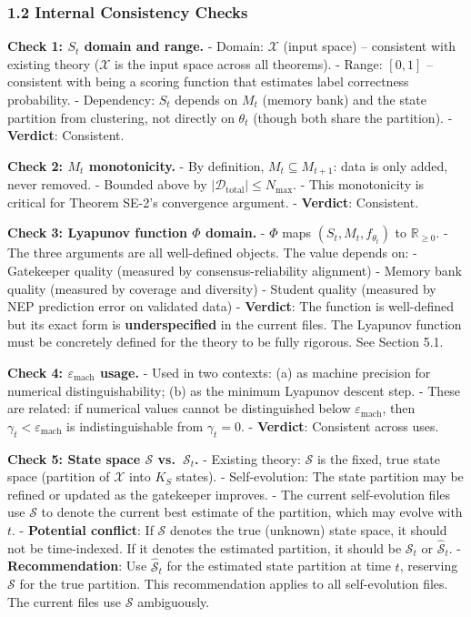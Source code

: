 \documentclass[
  12pt,
]{article}
\begin{document}
\subsubsection{1.2 Internal Consistency
Checks}\label{internal-consistency-checks}

\textbf{Check 1: \(S_t\) domain and range.} - Domain: \(\mathcal{X}\)
(input space) -- consistent with existing theory (\(\mathcal{X}\) is the
input space across all theorems). - Range: \([0,1]\) -- consistent with
being a scoring function that estimates label correctness probability. -
Dependency: \(S_t\) depends on \(M_t\) (memory bank) and the state
partition from clustering, not directly on \(\theta_t\) (though both
share the partition). - \textbf{Verdict}: Consistent.

\textbf{Check 2: \(M_t\) monotonicity.} - By definition,
\(M_t \subseteq M_{t+1}\): data is only added, never removed. - Bounded
above by \(|\mathcal{D}_{\text{total}}| \leq N_{\text{max}}\). - This
monotonicity is critical for Theorem SE-2's convergence argument. -
\textbf{Verdict}: Consistent.

\textbf{Check 3: Lyapunov function \(\Phi\) domain.} - \(\Phi\) maps
\((S_t, M_t, f_{\theta_t})\) to \(\mathbb{R}_{\geq 0}\). - The three
arguments are all well-defined objects. The value depends on: -
Gatekeeper quality (measured by consensus-reliability alignment) -
Memory bank quality (measured by coverage and diversity) - Student
quality (measured by NEP prediction error on validated data) -
\textbf{Verdict}: The function is well-defined but its exact form is
\textbf{underspecified} in the current files. The Lyapunov function must
be concretely defined for the theory to be fully rigorous. See Section
5.1.

\textbf{Check 4: \(\varepsilon_{\text{mach}}\) usage.} - Used in two
contexts: (a) as machine precision for numerical distinguishability; (b)
as the minimum Lyapunov descent step. - These are related: if numerical
values cannot be distinguished below \(\varepsilon_{\text{mach}}\), then
\(\gamma_t < \varepsilon_{\text{mach}}\) is indistinguishable from
\(\gamma_t = 0\). - \textbf{Verdict}: Consistent across uses.

\textbf{Check 5: State space \(\mathcal{S}\) vs.~\(\mathcal{S}_t\).} -
Existing theory: \(\mathcal{S}\) is the fixed, true state space
(partition of \(\mathcal{X}\) into \(K_S\) states). - Self-evolution:
The state partition may be refined or updated as the gatekeeper
improves. - The current self-evolution files use \(\mathcal{S}\) to
denote the current best estimate of the partition, which may evolve with
\(t\). - \textbf{Potential conflict}: If \(\mathcal{S}\) denotes the
true (unknown) state space, it should not be time-indexed. If it denotes
the estimated partition, it should be \(\mathcal{S}_t\) or
\(\hat{\mathcal{S}}_t\). - \textbf{Recommendation}: Use
\(\hat{\mathcal{S}}_t\) for the estimated state partition at time \(t\),
reserving \(\mathcal{S}\) for the true partition. This recommendation
applies to all self-evolution files. The current files use
\(\mathcal{S}\) ambiguously.
\end{document}
